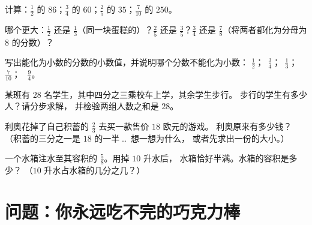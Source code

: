 \begin{exercise}[$\star$]\label{exo:g6:fractions:7}
计算：$\frac12$ 的 $86$；\quad $\frac34$ 的 $60$；\quad $\frac25$ 的
$35$；\quad $\frac{7}{10}$ 的 $250$。
\end{exercise}

\begin{exercise}[$\star$]\label{exo:g6:fractions:8}
哪个更大：$\frac12$ 还是 $\frac13$（同一块蛋糕的）？$\frac25$
还是 $\frac35$？$\frac34$ 还是 $\frac78$（将两者都化为分母为
$8$ 的分数）？
\end{exercise}

\begin{exercise}[$\star\star$]\label{exo:g6:fractions:9}
  写出能化为小数的分数的小数值，并说明哪个分数不能化为小数：
$\frac12$；\ $\frac34$；\ $\frac13$；\ $\frac{7}{10}$；
\ $\frac{9}{4}$。
\end{exercise}

\begin{exercise}[$\star\star$]\label{exo:g6:fractions:10}
某班有 $28$ 名学生，其中四分之三乘校车上学，其余学生步行。
步行的学生有多少人？请分步求解，
并检验两组人数之和是 $28$。
\end{exercise}

\begin{exercise}[$\star\star$]\label{exo:g6:fractions:11}
利奥花掉了自己积蓄的 $\frac23$ 去买一款售价 $18$ 欧元的游戏。
利奥原来有多少钱？（积蓄的三分之一是 $18$ 的一半\,\dots\ 想一想为什么，
或者先求出一份的大小。）
\end{exercise}

\begin{exercise}[$\star\star\star$]\label{exo:g6:fractions:12}
一个水箱注水至其容积的 $\frac58$。用掉 $10$ 升水后，
水箱恰好半满。水箱的容积是多少？
（$10$ 升水占水箱的几分之几？）
\end{exercise}

\section{问题：你永远吃不完的巧克力棒}


